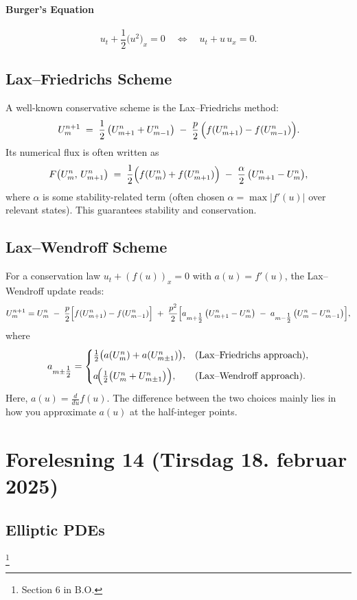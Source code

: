 \paragraph{Burger's Equation}
\[
  u_t + \frac{1}{2}\bigl(u^2\bigr)_x = 0
  \quad\Leftrightarrow\quad
  u_t + u\,u_x = 0.
\]

\subsection{Lax--Friedrichs Scheme}
A well-known conservative scheme is the Lax--Friedrichs method:
\[
  U_m^{n+1}
  \;=\;
  \frac12\,\bigl(U_{m+1}^n + U_{m-1}^n\bigr)
  \;-\;
  \frac{p}{2}\,\Bigl(f(U_{m+1}^n) - f(U_{m-1}^n)\Bigr).
\]
Its numerical flux is often written as
\[
  F\bigl(U_m^n,\,U_{m+1}^n\bigr)
  \;=\;
  \frac12\Bigl(f(U_m^n)+f(U_{m+1}^n)\Bigr)
  \;-\;
  \frac{\alpha}{2}\,\bigl(U_{m+1}^n - U_m^n\bigr),
\]
where \(\alpha\) is some stability-related term (often chosen \(\alpha = \max |f'(u)|\) over relevant states). This guarantees stability and conservation.

\subsection{Lax--Wendroff Scheme}
For a conservation law \(u_t + (f(u))_x = 0\) with \(a(u) = f'(u)\), the Lax--Wendroff update reads:
\[
  U_m^{n+1}
  =
  U_m^n
  \;-\;
  \frac{p}{2}\Bigl[f(U_{m+1}^n)-f(U_{m-1}^n)\Bigr]
  \;+\;
  \frac{p^2}{2}\Bigl[
    a_{m+\tfrac12}\,\bigl(U_{m+1}^n - U_m^n\bigr)
    \;-\;
    a_{m-\tfrac12}\,\bigl(U_m^n - U_{m-1}^n\bigr)
    \Bigr],
\]
where
\[
  a_{m\pm\tfrac12}
  =
  \begin{cases}
    \tfrac12\bigl(a(U_m^n)+a(U_{m\pm1}^n)\bigr),            & \text{(Lax--Friedrichs approach)}, \\[6pt]
    a\!\Bigl(\tfrac12\bigl(U_m^n + U_{m\pm1}^n\bigr)\Bigr), & \text{(Lax--Wendroff approach)}.
  \end{cases}
\]
Here, \(a(u) = \frac{d}{du}f(u)\). The difference between the two choices mainly lies in how you approximate \(a(u)\) at the half-integer points.
\section{Forelesning 14 (Tirsdag 18. februar 2025)}
\subsection{Elliptic PDEs}\footnote{Section 6 in B.O.}

